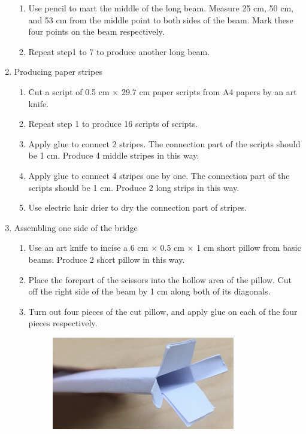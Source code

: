 \begin{enumerate}
\begin{enumerate}
	\item Use pencil to mart the middle of the long beam. Measure 25 cm, 50 cm, and 53 cm from the middle point to both sides of the beam. Mark these four points on the beam respectively. 
	\item Repeat step1 to 7 to produce another long beam. 
	\end{enumerate}
\item Producing paper stripes
	\begin{enumerate}
	\item Cut a script of 0.5 cm $\times$ 29.7 cm paper scripts from A4 papers by an art knife. 
	\item Repeat step 1 to produce 16 scripts of scripts.
	\item Apply glue to connect 2 stripes. The connection part of the scripts should be 1 cm. Produce 4 middle stripes in this way.
	\item Apply glue to connect 4 stripes one by one. The connection part of the scripts should be 1 cm. Produce 2 long strips in this way.
	\item Use electric hair drier to dry the connection part of stripes.
	\end{enumerate}
\item Assembling one side of the bridge
	\begin{enumerate}
	\item Use an art knife to incise a 6 cm $\times$ 0.5 cm $\times$ 1 cm short pillow from basic beams. Produce 2 short pillow in this way. 
	\item Place the forepart of the scissors into the hollow area of the pillow. Cut off the right side of the beam by 1 cm along both of its diagonals.
	\item Turn out four pieces of the cut pillow, and apply glue on each of the four pieces respectively.
	\begin{figure}[H]
	\begin{center}
	\includegraphics[width=8cm]{figure/procedureBridge/p1}
	\end{center}
	\end{figure}

\end{enumerate}
\end{enumerate}
